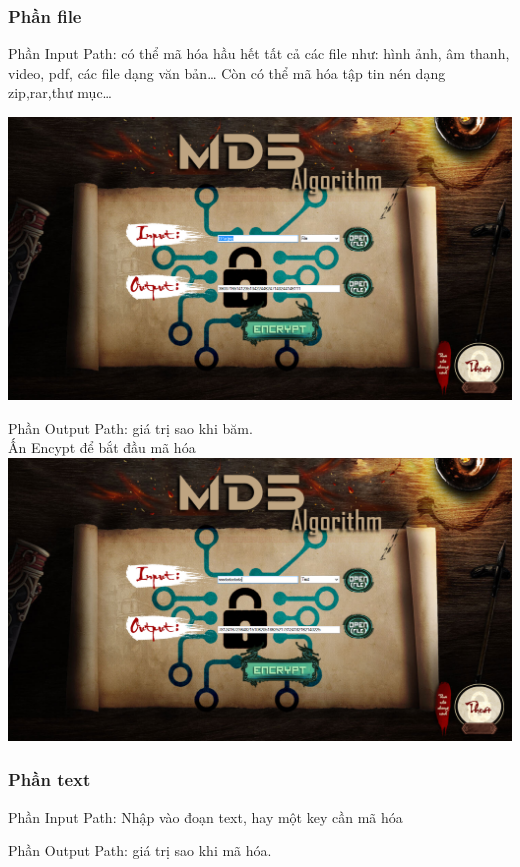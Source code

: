 \documentclass[paper=a4, fontsize=11pt]{scrartcl}	%
\numberwithin{equation}{section}															%
\numberwithin{figure}{section}																%
\numberwithin{table}{section}																%
\begin{document}
 	   \subsubsection{Phần file}
 		Phần Input Path: có thể mã hóa hầu hết tất cả các file như: hình ảnh, âm thanh, video, pdf, các file dạng văn bản… Còn có thể mã hóa tập tin nén dạng zip,rar,thư mục…
 			\begin{center}
				\includegraphics[scale=0.4]{MD5MAHOAFILE}
			\end{center}
		Phần Output Path: giá trị sao khi băm.\\
		
		Ấn Encypt để bắt đầu mã hóa\\
		
		\includegraphics[scale=0.4]{MD5TEXT}
 		\subsubsection{Phần text}
 		Phần Input Path: Nhập vào đoạn text, hay một key cần mã hóa
 		
		Phần Output Path: giá trị sao khi mã hóa.\\
			
\end{document}
